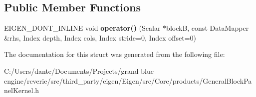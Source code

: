 \subsection*{Public Member Functions}
\begin{DoxyCompactItemize}
\item 
\mbox{\label{struct_eigen_1_1internal_1_1gemm__pack__rhs_3_01_scalar_00_01_index_00_01_data_mapper_00_01nr_00b7f2442d9ba6129104d4662213736528_a1ff23e11b13421a4c2649dcd6b0ae951}} 
E\+I\+G\+E\+N\+\_\+\+D\+O\+N\+T\+\_\+\+I\+N\+L\+I\+NE void {\bfseries operator()} (Scalar $\ast$blockB, const Data\+Mapper \&rhs, Index depth, Index cols, Index stride=0, Index offset=0)
\end{DoxyCompactItemize}


The documentation for this struct was generated from the following file\+:\begin{DoxyCompactItemize}
\item 
C\+:/\+Users/dante/\+Documents/\+Projects/grand-\/blue-\/engine/reverie/src/third\+\_\+party/eigen/\+Eigen/src/\+Core/products/General\+Block\+Panel\+Kernel.\+h\end{DoxyCompactItemize}
